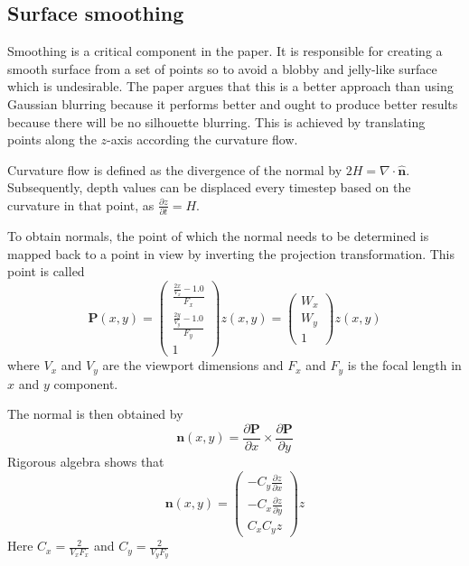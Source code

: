 \subsection{Surface smoothing}
\label{sec:smoothing}
Smoothing is a critical component in the paper. It is responsible for creating a smooth surface from a set of points so to avoid a blobby and jelly-like surface which is undesirable. The paper argues that this is a better approach than using Gaussian blurring because it performs better and ought to produce better results because there will be no silhouette blurring. 
This is achieved by translating points along the $z$-axis according the curvature flow. 

Curvature flow is defined as the divergence of the normal by \(2H = \nabla \cdot \hat{\mathbf{n}}\). Subsequently, depth values can be displaced every timestep based on the curvature in that point, as \(\frac{\partial z}{\partial t} = H\).

To obtain normals, the point of which the normal needs to be determined is mapped back to a point in view by inverting the projection transformation. This point is called \begin{equation}
	\label{eq:pcalc}
	\mathbf{P}(x, y) = \begin{pmatrix}\frac{\frac{2x}{V_x} - 1.0}{F_x}\\\frac{\frac{2y}{V_y} - 1.0}{F_y}\\1\end{pmatrix}z(x,y) = \begin{pmatrix}W_x\\W_y\\1\end{pmatrix}z(x,y)
\end{equation}
where \(V_x\) and \(V_y\) are the viewport dimensions and \(F_x\) and \(F_y\) is the focal length in \(x\) and \(y\) component.

The normal is then obtained by 
\begin{equation}
	\label{eq:norm}
	\mathbf{n}(x,y) = \frac{\partial \mathbf{P}}{\partial x} \times \frac{\partial \mathbf{P}}{\partial y}
\end{equation}
Rigorous algebra shows that 
\begin{equation}
	\label{eq:normals}
	\mathbf{n}(x,y) = \begin{pmatrix}-C_y\frac{\partial z}{\partial x}\\-C_x\frac{\partial z}{\partial y}\\C_xC_yz\end{pmatrix}z
\end{equation}
Here \(C_x = \frac{2}{V_xF_x}\) and \(C_y = \frac{2}{V_yF_y}\) 

